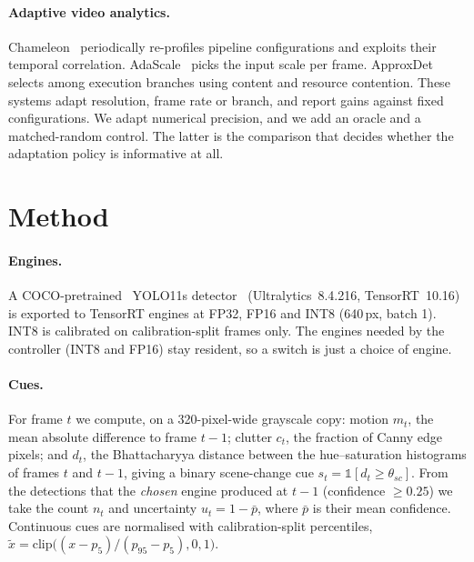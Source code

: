 \documentclass{svproc}
\begin{document}
\paragraph{Adaptive video analytics.} Chameleon~\cite{chameleon2018} periodically re-profiles pipeline
configurations and exploits their temporal correlation. AdaScale~\cite{adascale2019} picks the input scale per frame. ApproxDet~\cite{approxdet2020} selects among execution branches using content and resource contention. These systems adapt resolution, frame rate or branch, and report gains against fixed
configurations. We adapt numerical precision, and we add an oracle and a matched-random control. The latter is the comparison
that decides whether the adaptation policy is informative at all.

\section{Method}\label{sec:method}
\paragraph{Engines.} A COCO-pretrained~\cite{coco} YOLO11s detector~\cite{ultralytics} (Ultralytics~8.4.216, TensorRT~10.16) is exported to TensorRT engines at FP32,
FP16 and INT8 (640\,px, batch 1). INT8 is calibrated on calibration-split frames only. The engines needed by the
controller (INT8 and FP16) stay resident, so a switch is just a choice of engine.

\paragraph{Cues.} For frame $t$ we compute, on a 320-pixel-wide grayscale copy: motion $m_t$, the mean absolute
difference to frame $t{-}1$; clutter $c_t$, the fraction of Canny edge pixels; and $d_t$, the Bhattacharyya distance
between the hue--saturation histograms of frames $t$ and $t{-}1$, giving a binary scene-change cue
$s_t=\mathbb{1}[d_t\ge\theta_{sc}]$. From the detections that the \emph{chosen} engine produced at $t{-}1$ (confidence
$\ge 0.25$) we take the count $n_t$ and uncertainty $u_t = 1-\bar{p}$, where $\bar{p}$ is their mean confidence.
Continuous cues are normalised with calibration-split percentiles, $\tilde{x}=\mathrm{clip}\big((x-p_5)/(p_{95}-p_5),0,1\big)$.
\end{document}
